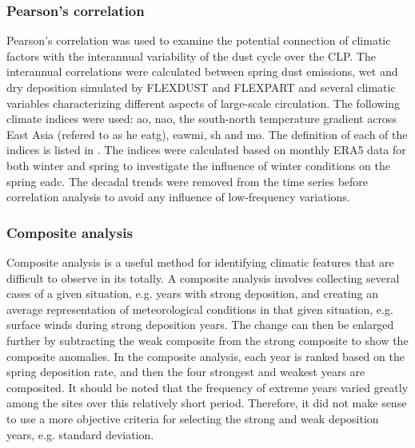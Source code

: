 \subsubsection{Pearson's correlation}
Pearson's correlation was used to examine the potential connection of climatic factors with the interannual variability of the dust cycle over the CLP. 
The interannual correlations were calculated between spring dust emissions, wet and dry deposition simulated by FLEXDUST and FLEXPART and several climatic variables characterizing different aspects of large-scale circulation. The following climate indices were used:
\acrshort{ao}, \acrshort{nao}, the south-north temperature gradient across East Asia (refered to as he \acrshort{eatg}), \acrshort{eawmi}, \acrshort{sh} and \acrshort{mo}. The definition of each of the indices is listed in . 
The indices were calculated based on monthly ERA5 data for both winter and spring to investigate the influence of winter conditions on the spring \acrshort{eadc}.
The decadal trends were removed from the time series before correlation analysis to avoid any influence of low-frequency variations.
 
\subsubsection{Composite analysis}
Composite analysis is a useful method for identifying climatic features that are difficult to observe in its totally. 
A composite analysis involves collecting several cases of a given situation, e.g. years with strong deposition, and creating an average representation of meteorological conditions in that given situation, e.g. surface winds during strong deposition years. 
The change can then be enlarged further by subtracting the weak composite from the strong composite to show the composite anomalies. 
In the composite analysis, each year is ranked based on the spring deposition rate, and then the four strongest and weakest years are composited. It should be noted that the frequency of extreme years varied greatly among the sites over this relatively short period. Therefore, it did not make sense to use a more objective criteria for selecting the strong and weak deposition years, e.g. standard deviation. 


